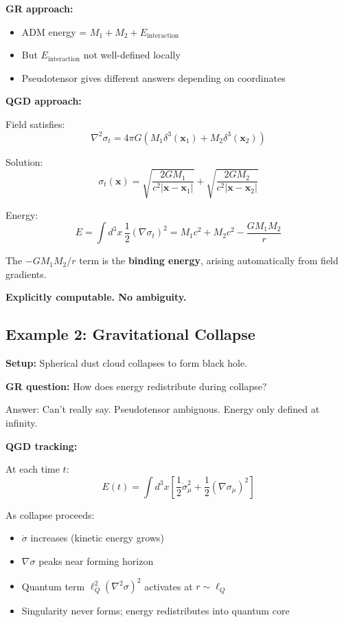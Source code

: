 \documentclass[11pt,a4paper]{article}
\theoremstyle{definition}
\theoremstyle{remark}
\begin{document}
	\textbf{GR approach:}
	\begin{itemize}
		\item ADM energy = $M_1 + M_2 + E_{\text{interaction}}$
		\item But $E_{\text{interaction}}$ not well-defined locally
		\item Pseudotensor gives different answers depending on coordinates
	\end{itemize}
	
	\textbf{QGD approach:}
	
	Field satisfies:
	\begin{equation}
		\nabla^2\sigma_t = 4\pi G(M_1\delta^3(\mathbf{x}_1) + M_2\delta^3(\mathbf{x}_2))
	\end{equation}
	
	Solution:
	\begin{equation}
		\sigma_t(\mathbf{x}) = \sqrt{\frac{2GM_1}{c^2|\mathbf{x}-\mathbf{x}_1|}} + \sqrt{\frac{2GM_2}{c^2|\mathbf{x}-\mathbf{x}_2|}}
	\end{equation}
	
	Energy:
	\begin{equation}
		E = \int d^3x\,\frac{1}{2}(\nabla\sigma_t)^2 = M_1c^2 + M_2c^2 - \frac{GM_1M_2}{r}
	\end{equation}
	
	The $-GM_1M_2/r$ term is the \textbf{binding energy}, arising automatically from field gradients.
	
	\textbf{Explicitly computable. No ambiguity.}
	
	\subsection{Example 2: Gravitational Collapse}
	
	\textbf{Setup:} Spherical dust cloud collapses to form black hole.
	
	\textbf{GR question:} How does energy redistribute during collapse?
	
	Answer: Can't really say. Pseudotensor ambiguous. Energy only defined at infinity.
	
	\textbf{QGD tracking:}
	
	At each time $t$:
	\begin{equation}
		E(t) = \int d^3x\left[\frac{1}{2}\dot{\sigma}_\mu^2 + \frac{1}{2}(\nabla\sigma_\mu)^2\right]
	\end{equation}
	
	As collapse proceeds:
	\begin{itemize}
		\item $\dot{\sigma}$ increases (kinetic energy grows)
		\item $\nabla\sigma$ peaks near forming horizon
		\item Quantum term $\ell_Q^2(\nabla^2\sigma)^2$ activates at $r \sim \ell_Q$
		\item Singularity never forms; energy redistributes into quantum core
	\end{itemize}
	
\end{document}
